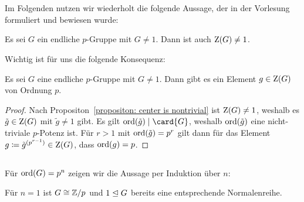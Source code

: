 \section{}

Im Folgenden nutzen wir wiederholt die folgende Aussage, der in der Vorlesung formuliert und bewiesen wurde:

\begin{proposition}
  \label{propositon: center is nontrivial}
  Es sei $G$ ein endliche $p$-Gruppe mit $G \neq 1$.
  Dann ist auch $\operatorname{Z}(G) \neq 1$.
\end{proposition}

Wichtig ist für uns die folgende Konsequenz:

\begin{corollary}
  \label{corollary: center contains an element of order p}
  Es sei $G$ eine endliche $p$-Gruppe mit $G \neq 1$.
  Dann gibt es ein Element $g \in \operatorname{Z}(G)$ von Ordnung $p$.
\end{corollary}

\begin{proof}
  Nach Propositon~\ref{propositon: center is nontrivial} ist $\operatorname{Z}(G) \neq 1$, weshalb es $\tilde{g} \in \operatorname{Z}(G)$ mit $\tilde{g} \neq 1$ gibt.
  Es gilt $\ord{\tilde{g}} \divides \card{G}$, weshalb $\operatorname{ord}(\tilde{g})$ eine nicht-triviale $p$-Potenz ist.
  Für $r > 1$ mit $\operatorname{ord}(\tilde{g}) = p^r$ gilt dann für das Element $g \coloneqq \tilde{g}^{(p^{r-1})} \in \operatorname{Z}(G)$, dass $\operatorname{ord}(g) = p$.
\end{proof}





\subsection{}

Für $\operatorname{ord}(G) = p^n$ zeigen wir die Aussage per Induktion über $n$:

Für $n = 1$ ist $G \cong \mathbb{Z}/p$ und $1 \trianglelefteq G$ bereits eine entsprechende Normalenreihe.

